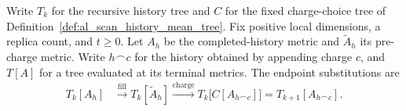 
Write $T_k$ for the recursive history tree and $C$ for the fixed charge-choice
tree of Definition~\ref{def:al_scan_history_mean_tree}. Fix positive local
dimensions, a replica count, and $t\ge0$. Let $A_h$ be the completed-history metric and
$\widetilde A_h$ its pre-charge metric. Write $h\frown c$ for the history
obtained by appending charge $c$, and $T[A]$ for a tree evaluated at its
terminal metrics. The endpoint substitutions are
\begin{align}
    T_k[A_h] & \xrightarrow{\mathrm{fill}} T_k[\widetilde A_h]
    \xrightarrow{\mathrm{charge}} T_k\bigl[{C[A_{h\frown c}]}\bigr]
    =T_{k+1}[A_{h\frown c}].
    \label{eq:al_scan_recursive_substitution}
\end{align}

